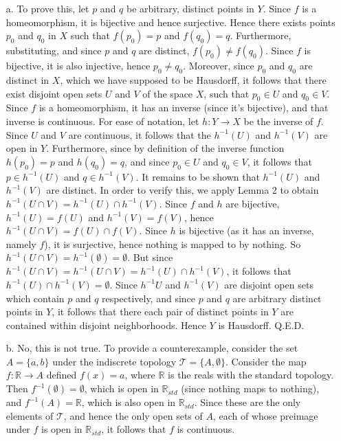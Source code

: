 \documentclass{article}
\newcommand{\inv}[1]{#1^{-1}}
\newcommand{\R}{\mathbb{R}}
\newcommand{\topT}{\mathcal{T}}
\newcommand{\inv}[1]{#1^{-1}}
\newcommand{\R}{\mathbb{R}}
\newcommand{\topT}{\mathcal{T}}
\begin{document}
    \begin{itemize}
        \item[a. ]  To prove this, let $p$ and $q$ be arbitrary, distinct points in $Y$. Since $f$ is a homeomorphism, it is bijective and hence surjective. Hence there exists points $p_0$ and $q_0$ in $X$ such that $f(p_0) = p$ and $f(q_0) = q$. Furthermore, substituting, and since $p$ and $q$ are distinct, $f(p_0) \ne f(q_0)$. Since $f$ is bijective, it is also injective, hence $p_0\ne q_0$. Moreover, since $p_0$ and $q_0$ are distinct in $X$, which we have supposed to be Hausdorff, it follows that there exist disjoint open sets $U$ and $V$ of the space $X$, such that $p_0\in U$ and $q_0\in V$. \\
    
        Since $f$ is a homeomorphism, it has an inverse (since it's bijective), and that inverse is continuous. For ease of notation, let $h:Y\rightarrow X$ be the inverse of $f$. Since $U$ and $V$ are continuous, it follows that the $\inv{h}(U)$ and $ \inv{h}(V)$ are open in $Y$. Furthermore, since by definition of the inverse function $h(p_0) = p$ and $h(q_0) = q$, and since $p_0\in U$ and $q_0\in V$, it follows that $p\in \inv{h}(U)$ and $q\in \inv{h}(V)$. It remains to be shown that $\inv{h}(U)$ and $\inv{h}(V)$ are distinct. In order to verify this, we apply Lemma 2 to obtain $\inv{h}(U\cap V) = \inv{h}(U)\cap \inv{h}(V)$. Since $f$ and $h$ are bijective, $\inv{h}(U) = f(U)$ and $\inv{h}(V) = f(V)$, hence $ \inv{h}(U\cap V) = f(U) \cap f(V)$. Since $h$ is bijective (as it has an inverse, namely $f$), it is surjective, hence nothing is mapped to by nothing. So $\inv{h}(U \cap V) = \inv{h}(\emptyset) = \emptyset$. But since $\inv{h}(U \cap V) = \inv{h}(U\cap V) = \inv{h}(U) \cap \inv{h}(V)$, it follows that $\inv{h}(U) \cap \inv{h}(V) = \emptyset$. Since $\inv{h}{U}$ and $\inv{h}(V)$ are disjoint open sets which contain $p$ and $q$ respectively, and since $p$ and $q$ are arbitrary distinct points in $Y$, it follows that there each pair of distinct points in $Y$ are contained within disjoint neighborhoods. Hence $Y$ is Hausdorff. Q.E.D.
        
        
        \item[b. ] No, this is not true. To provide a counterexample, consider the set $A = \{a,b\}$ under the indiscrete topology $\topT = \{A, \emptyset\}$. Consider the map $f:\R\rightarrow A$ defined $f(x) = a$, where $\R$ is the reals with the standard topology. Then $\inv{f}(\emptyset) = \emptyset$, which is open in $\R_{std}$ (since nothing maps to nothing), and $\inv{f}(A) = \R$, which is also open in $\R_{std}$. Since these are the only elements of $\topT$, and hence the only open sets of $A$, each of whose preimage under $f$ is open in $\R_{std}$, it follows that $f$ is continuous.\\
    

\end{itemize}
\end{document}
